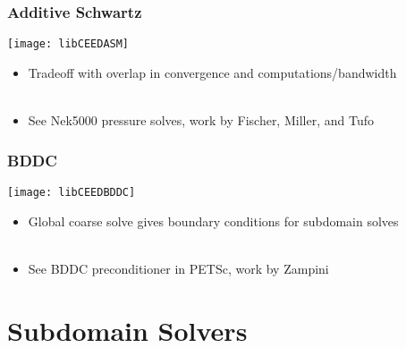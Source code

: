 \documentclass{beamer}
\begin{document}
\begin{frame}
\begin{center}
\frametitle{Additive Schwartz}

\texttt{[image: libCEEDASM]}

\begin{itemize}

\item Tradeoff with overlap in convergence and computations/bandwidth\\

~\\

\item See Nek5000 pressure solves, work by Fischer, Miller, and Tufo

\end{itemize}

\end{center}
\end{frame}


\begin{frame}
\begin{center}
\frametitle{BDDC}

\texttt{[image: libCEEDBDDC]}

\begin{itemize}

\item Global coarse solve gives boundary conditions for subdomain solves\\

~\\

\item See BDDC preconditioner in PETSc, work by Zampini

\end{itemize}

\end{center}
\end{frame}

\section{Subdomain Solvers}
\end{document}
